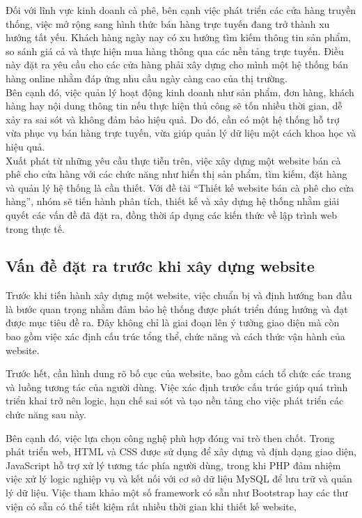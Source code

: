 \documentclass[pt = 12,a4paper]{article}
\begin{document}
\hspace{0.4cm}Đối với lĩnh vực kinh doanh cà phê, bên cạnh việc phát triển các cửa hàng truyền thống, việc mở rộng sang hình thức bán hàng trực tuyến đang trở thành xu hướng tất yếu. Khách hàng ngày nay có xu hướng tìm kiếm thông tin sản phẩm, so sánh giá cả và thực hiện mua hàng thông qua các nền tảng trực tuyến. Điều này đặt ra yêu cầu cho các cửa hàng phải xây dựng cho mình một hệ thống bán hàng online nhằm đáp ứng nhu cầu ngày càng cao của thị trường.\\

\hspace{0.4cm}Bên cạnh đó, việc quản lý hoạt động kinh doanh như sản phẩm, đơn hàng, khách hàng hay nội dung thông tin nếu thực hiện thủ công sẽ tốn nhiều thời gian, dễ xảy ra sai sót và không đảm bảo hiệu quả. Do đó, cần có một hệ thống hỗ trợ vừa phục vụ bán hàng trực tuyến, vừa giúp quản lý dữ liệu một cách khoa học và hiệu quả.\\

\hspace{0.4cm}Xuất phát từ những yêu cầu thực tiễn trên, việc xây dựng một website bán cà phê cho cửa hàng với các chức năng như hiển thị sản phẩm, tìm kiếm, đặt hàng và quản lý hệ thống là cần thiết. Với đề tài “Thiết kế website bán cà phê cho cửa hàng”, nhóm sẽ tiến hành phân tích, thiết kế và xây dựng hệ thống nhằm giải quyết các vấn đề đã đặt ra, đồng thời áp dụng các kiến thức về lập trình web trong thực tế.

\subsection{Vấn đề đặt ra trước khi xây dựng website}

\hspace{0.4cm} Trước khi tiến hành xây dựng một website, việc chuẩn bị và định hướng ban đầu là bước quan trọng nhằm đảm bảo hệ thống được phát triển đúng hướng và đạt được mục tiêu đề ra. Đây không chỉ là giai đoạn lên ý tưởng giao diện mà còn bao gồm việc xác định cấu trúc tổng thể, chức năng và cách thức vận hành của website.

\hspace{0.4cm} Trước hết, cần hình dung rõ bố cục của website, bao gồm cách tổ chức các trang và luồng tương tác của người dùng. Việc xác định trước cấu trúc giúp quá trình triển khai trở nên logic, hạn chế sai sót và tạo nền tảng cho việc phát triển các chức năng sau này.

\hspace{0.4cm} Bên cạnh đó, việc lựa chọn công nghệ phù hợp đóng vai trò then chốt. Trong phát triển web, HTML và CSS được sử dụng để xây dựng và định dạng giao diện, JavaScript hỗ trợ xử lý tương tác phía người dùng, trong khi PHP đảm nhiệm việc xử lý logic nghiệp vụ và kết nối với cơ sở dữ liệu MySQL để lưu trữ và quản lý dữ liệu. Việc tham khảo một số framework có sẵn như Bootstrap hay các thư viện có sẵn có thể tiết kiệm rất nhiều thời gian khi thiết kế website,
\end{document}
